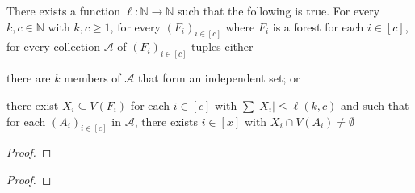 \documentclass{patmorin}
\begin{document}
\begin{lem}
There exists a function $\ell:\mathbb{N}\to\mathbb{N}$ such that the following is true. 
For every $k,c\in\mathbb{N}$ with $k,c\geq1$, 
for every $(F_i)_{i\in[c]}$ where $F_i$ is a forest for each $i\in[c]$,
for every collection $\mathcal{A}$ of $(F_i)_{i\in[c]}$-tuples
either
   \begin{tightenum}%
     \item there are $k$ members of $\mathcal{A}$ that form an independent set; or
     \item there exist $X_i \subseteq V(F_i)$ for each $i\in[c]$ with 
     $\sum|X_i|\leq \ell(k,c)$ and such that 
     for each $(A_i)_{i\in[c]}$ in $\mathcal{A}$, 
     there exists $i\in[x]$ with
     $X_i\cap V(A_i)\neq\emptyset$ 
   \end{tightenum}
\end{lem}
\begin{proof}
\end{proof}

\hungarians*
\begin{proof}
\end{proof}
\end{document}
